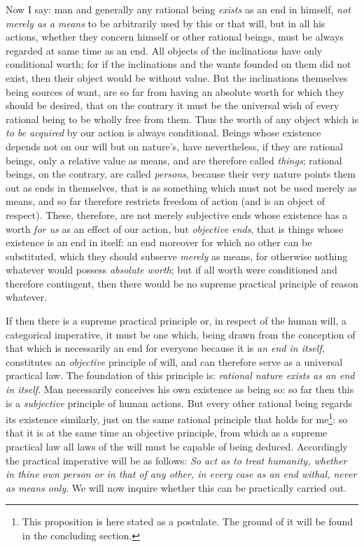 Now I say: man and generally any rational being \textit{exists} as an
end in himself, \textit{not merely as a means} to be arbitrarily used
by this or that will, but in all his actions, whether they concern
himself or other rational beings, must be always regarded at same time
as an end. All objects of the inclinations have only conditional
worth; for if the inclinations and the wants founded on them did not
exist, then their object would be without value. But the inclinations
themselves being sources of want, are so far from having an absolute
worth for which they should be desired, that on the contrary it must
be the universal wish of every rational being to be wholly free from
them. Thus the worth of any object which is \textit{to be acquired} by
our action is always conditional. Beings whose existence depends not
on our will but on nature's, have nevertheless, if they are rational
beings, only a relative value as means, and are therefore called
\textit{things}; rational beings, on the contrary, are called
\textit{persons}, because their very nature points them out as ends in
themselves, that is as something which must not be used merely as
means, and so far therefore restricts freedom of action (and is an
object of respect). These, therefore, are not merely subjective ends
whose existence has a worth \textit{for us} as an effect of our
action, but \textit{objective ends}, that is things whose existence is
an end in itself: an end moreover for which no other can be
substituted, which they should subserve \textit{merely} as means, for
otherwise nothing whatever would possess \textit{absolute worth}; but
if all worth were conditioned and therefore contingent, then there
would be no supreme practical principle of reason whatever.

If then there is a supreme practical principle or, in respect of
 the human will, a categorical imperative, it must be one
which, being drawn from the conception of that which is necessarily an
end for everyone because it is \textit{an end in itself}, constitutes
an \textit{objective} principle of will, and can therefore serve as a
universal practical law. The foundation of this principle is:
\textit{rational nature exists as an end in itself}. Man necessarily
conceives his own existence as being so: so far then this is a
\textit{subjective} principle of human actions. But every other
rational being regards its existence similarly, just on the same
rational principle that holds for me\footnote{This proposition is here
stated as a postulate. The ground of it will be found in the
concluding section.}: so that it is at the same time an objective
principle, from which as a supreme practical law all laws of the will
must be capable of being deduced. Accordingly the practical imperative
will be as follows: \textit{So act as to treat humanity, whether in
thine own person or in that of any other, in every case as an end
withal, never as means only}. We will now inquire whether this can be
practically carried out.

